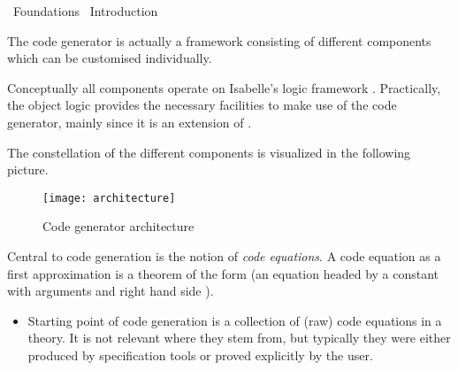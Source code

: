 %
\begin{isabellebody}%
\def\isabellecontext{Foundations}%
%
\isadelimtheory
%
\endisadelimtheory
%
\isatagtheory
{}\isamarkupfalse%
\ Foundations\isanewline
{}\ Introduction\isanewline
{}%
\endisatagtheory
{\isafoldtheory}%
%
\isadelimtheory
%
\endisadelimtheory
%
\isamarkuptrue%
%
\isamarkuptrue%
%
\begin{isamarkuptext}%
The code generator is actually a framework consisting of different
  components which can be customised individually.

  Conceptually all components operate on Isabelle's logic framework
  \hyperlink{theory.Pure}{\mbox{}}.  Practically, the object logic \hyperlink{theory.HOL}{\mbox{}}
  provides the necessary facilities to make use of the code generator,
  mainly since it is an extension of \hyperlink{theory.Pure}{\mbox{}}.

  The constellation of the different components is visualized in the
  following picture.

  \begin{figure}[h]
    \texttt{[image: architecture]}
    \caption{Code generator architecture}
    \label{fig:arch}
  \end{figure}

  \noindent Central to code generation is the notion of \emph{code
  equations}.  A code equation as a first approximation is a theorem
  of the form  (an equation headed by a
  constant  with arguments  and right
  hand side ).

  \begin{itemize}

    \item Starting point of code generation is a collection of (raw)
      code equations in a theory. It is not relevant where they stem
      from, but typically they were either produced by specification
      tools or proved explicitly by the user.
      

\end{itemize}
\end{isamarkuptext}
\end{isabellebody}
